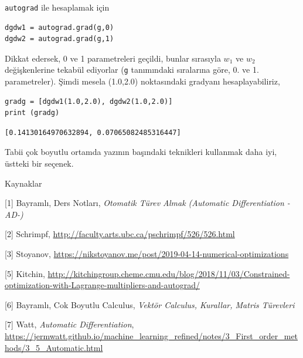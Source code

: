 \documentclass[12pt,fleqn]{article}\usepackage{../../common}
\begin{document}
\verb!autograd! ile hesaplamak için 

\begin{verbatim}
dgdw1 = autograd.grad(g,0)
dgdw2 = autograd.grad(g,1)
\end{verbatim}

Dikkat edersek, 0 ve 1 parametreleri geçildi, bunlar sırasıyla $w_1$ ve
$w_2$ değişkenlerine tekabül ediyorlar (\verb!g! tanımındaki sıralarına
göre, 0. ve 1. parametreler). Şimdi mesela (1.0,2.0) noktasındaki gradyanı
hesaplayabiliriz,

\begin{verbatim}
gradg = [dgdw1(1.0,2.0), dgdw2(1.0,2.0)]
print (gradg)
\end{verbatim}

\begin{verbatim}
[0.14130164970632894, 0.07065082485316447]
\end{verbatim}

Tabii çok boyutlu ortamda yazının başındaki teknikleri kullanmak daha iyi,
üstteki bir seçenek.

Kaynaklar 

[1] Bayramlı, Ders Notları, {\em Otomatik Türev Almak (Automatic Differentiation -AD-)}

[2] Schrimpf, \url{http://faculty.arts.ubc.ca/pschrimpf/526/526.html}

[3] Stoyanov, \url{https://nikstoyanov.me/post/2019-04-14-numerical-optimizations}

[5] Kitchin, \url{http://kitchingroup.cheme.cmu.edu/blog/2018/11/03/Constrained-optimization-with-Lagrange-multipliers-and-autograd/}

[6] Bayramlı, Cok Boyutlu Calculus, {\em Vektör Calculus, Kurallar, Matris Türevleri}

[7] Watt, {\em Automatic Differentiation}, 
    \url{https://jermwatt.github.io/machine_learning_refined/notes/3_First_order_methods/3_5_Automatic.html}


    
\end{document}
